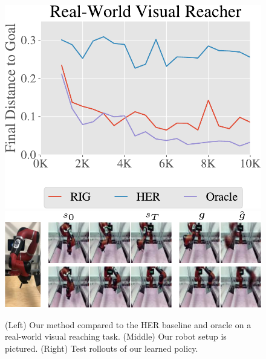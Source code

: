 \begin{figure}[ht!]
    \centering
    \includegraphics[width=0.31\linewidth]{rig/img/real_reacher.pdf}
    \includegraphics[width=0.67\linewidth]{rig/img/real_rollouts-crop.pdf}
    \caption{(Left) Our method compared to the HER baseline and oracle on a real-world visual reaching task. (Middle) Our robot setup is pictured. (Right) Test rollouts of our learned policy. }
    \label{fig:realworld-robot-results}
\end{figure}

